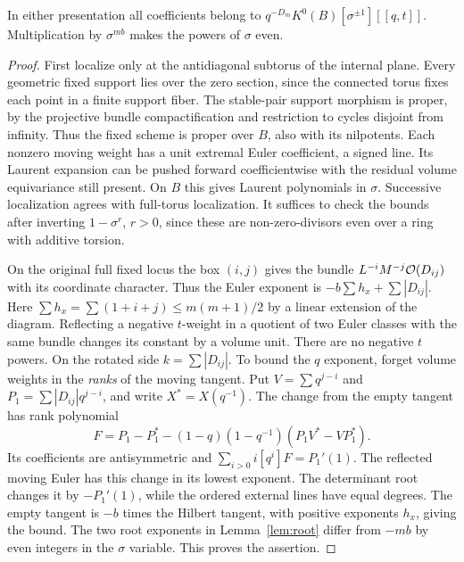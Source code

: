 \begin{lemma}\label{lem:ring}
In either presentation all coefficients belong to
$q^{-D_m}K^0(B)[\sigma^{\pm1}][[q,t]]$. Multiplication by $\sigma^{mb}$
makes the powers of $\sigma$ even.
\end{lemma}
\begin{proof}
First localize only at the antidiagonal subtorus of the internal
plane. Every geometric fixed support lies over the zero section,
since the connected torus fixes each point in a finite support
fiber. The stable-pair support morphism is proper, by the projective
bundle compactification and restriction to cycles disjoint from
infinity. Thus the fixed scheme is proper over $B$, also with its
nilpotents. Each nonzero moving weight has a unit extremal Euler
coefficient, a signed line. Its Laurent expansion can be pushed
forward coefficientwise with the residual volume equivariance still
present. On $B$ this gives Laurent polynomials in $\sigma$.
Successive localization agrees with full-torus localization. It
suffices to check the bounds after inverting $1-\sigma^r$,
$r>0$, since these are non-zero-divisors even over a ring with
additive torsion.

On the original full fixed locus the box $(i,j)$ gives the
bundle $L^{-i}M^{-j}\mathcal O(D_{ij})$ with its coordinate character.
Thus the Euler exponent is $-b\sum h_x+\sum|D_{ij}|$.
Here $\sum h_x=\sum(1+i+j)\le m(m+1)/2$ by a linear extension of the
diagram. Reflecting a negative $t$-weight in a quotient of two Euler
classes with the same bundle changes its constant by a volume unit.
There are no negative $t$ powers. On the rotated side $k=\sum |D_{ij}|$.
To bound the $q$ exponent, forget volume weights in the \emph{ranks}
of the moving tangent. Put
$V=\sum q^{j-i}$ and $P_1=\sum |D_{ij}|q^{j-i}$, and write
$X^*=X(q^{-1})$. The change from the empty tangent has rank polynomial
\[
 F=P_1-P_1^*-(1-q)(1-q^{-1})(P_1V^*-VP_1^*).
\]
Its coefficients are antisymmetric and $\sum_{i>0}i[q^i]F=P_1'(1)$.
The reflected moving Euler has this change in its lowest exponent.
The determinant root changes it by $-P_1'(1)$, while the ordered
external lines have equal degrees. The empty tangent is $-b$ times
the Hilbert tangent, with positive exponents $h_x$, giving the bound.
The two root exponents in Lemma~\ref{lem:root} differ from $-mb$ by
even integers in the $\sigma$ variable. This proves the assertion.
\end{proof}
